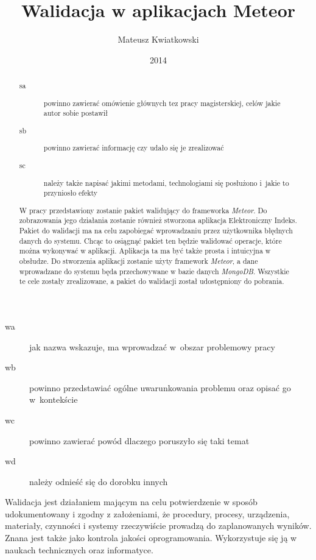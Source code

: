 \documentclass[brudnopis]{xmgr}
\author   {Mateusz Kwiatkowski}
\title    {Walidacja w aplikacjach Meteor}
\date     {2014}
\begin{document}
\begin{abstract}

\begin{description}
\item[sa] \textcolor{sa}{powinno zawierać omówienie głównych 
tez pracy magisterskiej, celów jakie autor sobie postawił} 
\item[sb] \textcolor{sb}{powinno zawierać informację czy udało 
  się je zrealizować}
\item[sc] \textcolor{sc}{należy także napisać jakimi metodami,
  technologiami się posłużono i~jakie to przyniosło efekty}
\end{description}

\textcolor{sa}{W pracy przedstawiony zostanie pakiet walidujący do frameworka \textit{Meteor}. Do zobrazowania
jego działania zostanie również stworzona aplikacja Elektroniczny Indeks. Pakiet do walidacji ma na celu zapobiegać
wprowadzaniu przez użytkownika błędnych danych do systemu. Chcąc to osiągnąć pakiet ten będzie
walidować operacje, które można wykonywać w aplikacji. Aplikacja ta ma być także prosta i intuicyjna w obsłudze.}
\textcolor{sc}{Do stworzenia aplikacji zostanie użyty framework \textit{Meteor}, a dane wprowadzane do systemu
będa przechowywane w bazie danych \textit{MongoDB}.} \textcolor{sb}{Wszystkie te cele zostały zrealizowane,
a pakiet do walidacji został udostępniony do pobrania.}

\end{abstract}

\maketitle
%
\introduction

\begin{description}
\item[wa] \textcolor{wa}{jak nazwa wskazuje, ma wprowadzać 
  w~obszar problemowy pracy}
\item[wb] \textcolor{wb}{powinno przedstawiać ogólne 
  uwarunkowania problemu oraz opisać go w~kontekście}
\item[wc] \textcolor{wc}{powinno zawierać powód dlaczego 
  poruszyło się taki temat}
\item[wd] \textcolor{wd}{należy odnieść się do dorobku innych}
\end{description}

\textcolor{wa}{Walidacja jest działaniem mającym na celu potwierdzenie w sposób udokumentowany i zgodny
z założeniami, że procedury, procesy, urządzenia, materiały, czynności i systemy rzeczywiście
prowadzą do zaplanowanych wyników. Znana jest także jako kontrola jakości oprogramowania.
Wykorzystuje się ją w naukach technicznych oraz informatyce.}
\\
\end{document}
